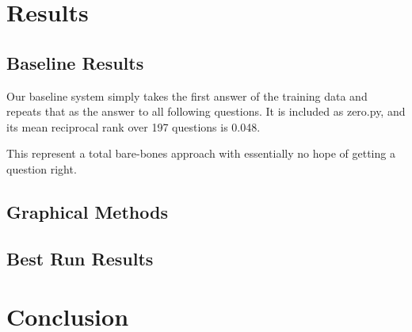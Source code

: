 \documentclass{article}
\begin{document}
\section{Results}


\subsection{Baseline Results}
Our baseline system simply takes the first answer of the training data and
repeats that as the answer to all following questions. It is included as
zero.py, and its mean reciprocal rank over 197 questions is 0.048.  

This represent a total bare-bones approach with essentially no hope of getting a
question right.

\subsection{Graphical Methods}

\subsection{Best Run Results}

\section{Conclusion}
\end{document}
